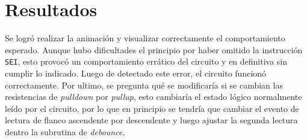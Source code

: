 \section{Resultados}

Se logró realizar la animación y visualizar correctamente el comportamiento esperado. Aunque hubo dificultades el principio por haber omitido la instrucción \texttt{SEI}, esto provocó un comportamiento errático del circuito y en definitiva sin cumplir lo indicado. Luego de detectado este error, el circuito funcionó correctamente.
Por ultimo, se pregunta qué se modificaría si se cambian las resistencias de \textit{pull\-down} por \textit{pull\-up}, esto cambiaría el estado lógico normalmente leído por el circuito, por lo que en principio se tendría que cambiar el evento de lectura de flanco ascendente por descendente y luego ajustar la segunda lectura dentro la subrutina de \textit{debounce}. 
 

